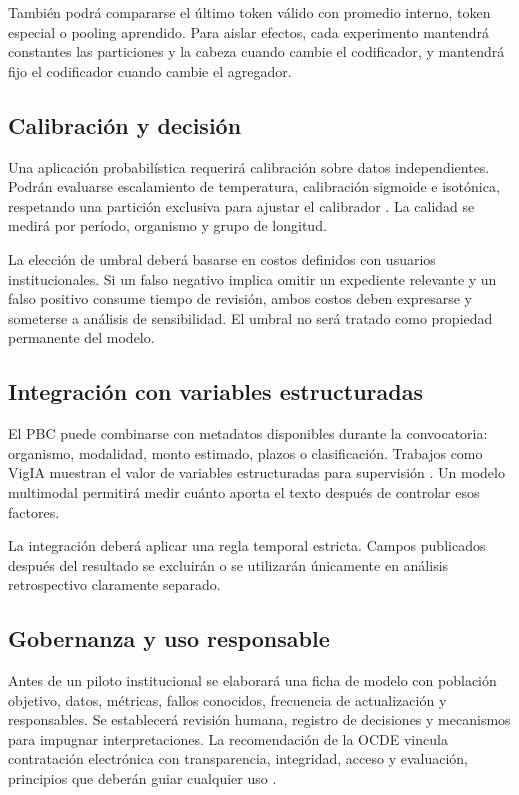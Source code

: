 También podrá compararse el último token válido con promedio interno, token especial o pooling aprendido. Para aislar efectos, cada experimento mantendrá constantes las particiones y la cabeza cuando cambie el codificador, y mantendrá fijo el codificador cuando cambie el agregador.

\subsection{Calibración y decisión}

Una aplicación probabilística requerirá calibración sobre datos independientes. Podrán evaluarse escalamiento de temperatura, calibración sigmoide e isotónica, respetando una partición exclusiva para ajustar el calibrador \parencite{guo2017calibration,silvafilho2023calibration}. La calidad se medirá por período, organismo y grupo de longitud.

La elección de umbral deberá basarse en costos definidos con usuarios institucionales. Si un falso negativo implica omitir un expediente relevante y un falso positivo consume tiempo de revisión, ambos costos deben expresarse y someterse a análisis de sensibilidad. El umbral no será tratado como propiedad permanente del modelo.

\subsection{Integración con variables estructuradas}

El PBC puede combinarse con metadatos disponibles durante la convocatoria: organismo, modalidad, monto estimado, plazos o clasificación. Trabajos como VigIA muestran el valor de variables estructuradas para supervisión \parencite{salazar2024vigia}. Un modelo multimodal permitirá medir cuánto aporta el texto después de controlar esos factores.

La integración deberá aplicar una regla temporal estricta. Campos publicados después del resultado se excluirán o se utilizarán únicamente en análisis retrospectivo claramente separado.

\subsection{Gobernanza y uso responsable}

Antes de un piloto institucional se elaborará una ficha de modelo con población objetivo, datos, métricas, fallos conocidos, frecuencia de actualización y responsables. Se establecerá revisión humana, registro de decisiones y mecanismos para impugnar interpretaciones. La recomendación de la OCDE vincula contratación electrónica con transparencia, integridad, acceso y evaluación, principios que deberán guiar cualquier uso \parencite{oecd2015procurement}.

